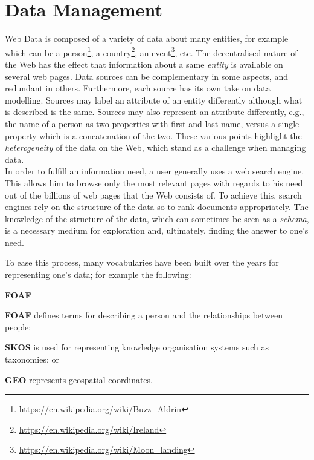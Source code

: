 \section{Data Management}
\label{chap:introduction:data-mgmt}

Web Data is composed of a variety of data about many entities, for example which can be a person\footnote{\url{https://en.wikipedia.org/wiki/Buzz_Aldrin}}, a country\footnote{\url{https://en.wikipedia.org/wiki/Ireland}}, an event\footnote{\url{https://en.wikipedia.org/wiki/Moon_landing}}, etc.
The decentralised nature of the Web has the effect that information about a same \emph{entity} is available on several web pages. Data sources can be complementary in some aspects, and redundant in others. Furthermore, each source has its own take on data modelling. Sources may label an attribute of an entity differently although what is described is the same. Sources may also represent an attribute differently, e.g., the name of a person as two properties with first and last name, versus a single property which is a concatenation of the two. These various points highlight the \emph{heterogeneity} of the data on the Web, which stand as a challenge when managing data.\\

In order to fulfill an information need, a user generally uses a web search engine. This allows him to browse only the most relevant pages with regards to his need out of the billions of web pages that the Web consists of. To achieve this, search engines rely on the structure of the data so to rank documents appropriately. The knowledge of the structure of the data, which can sometimes be seen as a \emph{schema}, is a necessary medium for exploration and, ultimately, finding the answer to one's need.

To ease this process, many vocabularies have been built over the years for representing one's data; for example the following:
\begin{labeling}{\textbf{FOAF}}
	\item[\textbf{FOAF}\protect\footnotemark] defines terms for describing a person and the relationships between people;
	\item[\textbf{SKOS}\protect\footnotemark] is used for representing knowledge organisation systems such as taxonomies; or
	\item[\textbf{GEO}\protect\footnotemark] represents geospatial coordinates.
\end{labeling}

